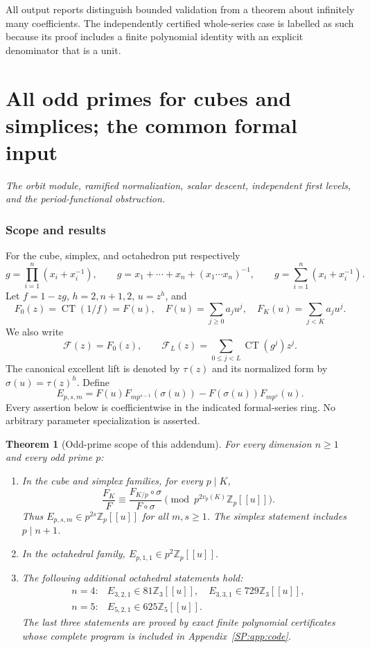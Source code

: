 \documentclass[11pt,a4paper]{article}
\newtheorem{theorem}{Theorem}[section]
\theoremstyle{definition}\newtheorem{definition}[theorem]{Definition}
\theoremstyle{remark}\newtheorem{remark}[theorem]{Remark}
\newcommand{\Z}{\mathbb Z}
\newcommand{\Zp}{\mathbb Z_p}
\DeclareMathOperator{\CT}{CT}
\numberwithin{equation}{section}
\newcommand{\partstart}[3]{\clearpage\part{#1}\label{#2}\noindent\textit{#3}\par\medskip}
\begin{document}
All output reports distinguish bounded validation from a theorem
about infinitely many coefficients. The independently certified
whole-series case is labelled as such because its proof includes
a finite polynomial identity with an explicit denominator that
is a unit.



\partstart{All odd primes for cubes and simplices; the common formal input}{part:small-primes}{The orbit module, ramified normalization, scalar descent, independent first levels, and the period-functional obstruction.}
\section{Scope and results}\label{SP:source-main-1}
For the cube, simplex, and octahedron put respectively
\[
g=\prod_{i=1}^n(x_i+x_i^{-1}),\qquad
g=x_1+\cdots+x_n+(x_1\cdots x_n)^{-1},\qquad
g=\sum_{i=1}^n(x_i+x_i^{-1}).
\]
Let $f=1-zg$, $h=2,n+1,2$, $u=z^h$, and
\[
F_0(z)=\CT(1/f)=F(u),\quad F(u)=\sum_{j\ge0}a_ju^j,
\quad F_K(u)=\sum_{j<K}a_ju^j.
\]
We also write
\[
\mathcal F(z)=F_0(z),\qquad
\mathcal F_L(z)=\sum_{0\le j<L}\CT(g^j)z^j.
\]
The canonical excellent lift is denoted by $\tau(z)$ and its normalized
form by $\sigma(u)=\tau(z)^h$. Define
\[
E_{p,s,m}=F(u)F_{mp^{s-1}}(\sigma(u))
             -F(\sigma(u))F_{mp^s}(u).
\]
Every assertion below is coefficientwise in the indicated formal-series
ring. No arbitrary parameter specialization is asserted.

\begin{theorem}[Odd-prime scope of this addendum]\label{SP:thm:scope}
For every dimension $n\ge1$ and every odd prime $p$:
\begin{enumerate}
\item In the cube and simplex families, for every $p\mid K$,
\[
\frac{F_K}{F}\equiv\frac{F_{K/p}\circ\sigma}{F\circ\sigma}
\pmod{p^{2v_p(K)}\Zp[[u]]}.
\]
Thus $E_{p,s,m}\in p^{2s}\Zp[[u]]$ for all $m,s\ge1$.
The simplex statement includes $p\mid n+1$.
\item In the octahedral family, $E_{p,1,1}\in p^2\Zp[[u]]$.
\item The following additional octahedral statements hold:
\[
\begin{array}{ll}
n=4:&E_{3,2,1}\in81\Z_3[[u]],\quad
       E_{3,3,1}\in729\Z_3[[u]],\\
n=5:&E_{5,2,1}\in625\Z_5[[u]].
\end{array}
\]
The last three statements are proved by exact finite polynomial
certificates whose complete program is included in Appendix~\ref{SP:app:code}.
\end{enumerate}
\end{theorem}
\end{document}
